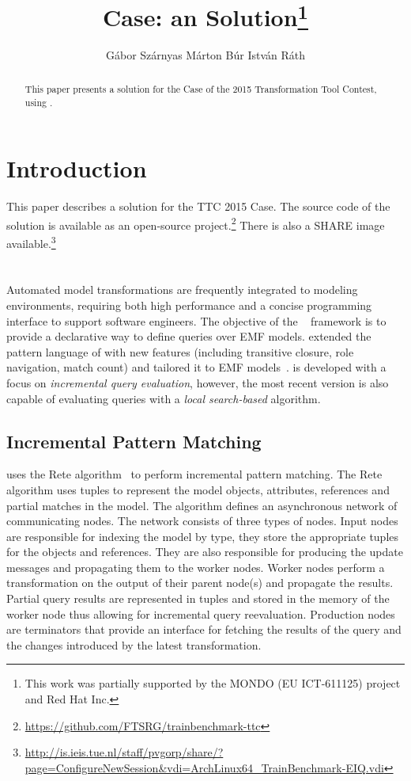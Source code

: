 \documentclass[submission,copyright,creativecommons]{eptcs}
\title{\tb Case: an \eiq Solution\thanks{This work was partially supported by the MONDO (EU ICT-611125) project and Red Hat Inc.}}
\author{G\'{a}bor Sz\'{a}rnyas \qquad M\'{a}rton B\'{u}r \qquad Istv\'{a}n R\'{a}th
\institute{Budapest University of Technology and Economics\\
Department of Measurement and Information Systems\\
H-1117 Magyar tud\'{o}sok krt. 2, Budapest, Hungary}
\email{szarnyas@mit.bme.hu, marton.bur@inf.mit.bme.hu, rath@mit.bme.hu}
}
\begin{document}
\maketitle

\begin{abstract}
This paper presents a solution for the \tb Case of the 2015 Transformation Tool Contest, using \eiq.
\end{abstract}

\section{Introduction}

This paper describes a solution for the TTC 2015 \tb Case. The source code of the solution is available as an open-source project.\footnote{\url{https://github.com/FTSRG/trainbenchmark-ttc}} There is also a SHARE image available.\footnote{\url{http://is.ieis.tue.nl/staff/pvgorp/share/?page=ConfigureNewSession&vdi=ArchLinux64_TrainBenchmark-EIQ.vdi}}

\section{\eiq}

Automated model transformations are frequently integrated to modeling environments, requiring both high performance and a concise programming interface to support software engineers. The objective of the \eiq~\cite{models2010, eiq-homepage} framework is to provide a declarative way to define queries over EMF models. \eiq extended the pattern language of \viatratwo with new features (including transitive closure, role navigation, match count) and tailored it to EMF models~\cite{iqpl}. \eiq is developed with a focus on \emph{incremental query evaluation}, however, the most recent version is also capable of evaluating queries with a \emph{local search-based} algorithm.

\subsection{Incremental Pattern Matching}

\eiq uses the Rete algorithm~\cite{BergmannPhD} to perform incremental pattern matching. The Rete algorithm uses tuples to represent the model objects, attributes, references and partial matches in the model. The algorithm defines an asynchronous network of communicating nodes. The network consists of three types of nodes. Input nodes are responsible for indexing the model by type, \ie they store the appropriate tuples for the objects and references. They are also responsible for producing the update messages and propagating them to the worker nodes. Worker nodes perform a transformation on the output of their parent node(s) and propagate the results. Partial query results are represented in tuples and stored in the memory of the worker node thus allowing for incremental query reevaluation. Production nodes are terminators that provide an interface for fetching the results of the query and the changes introduced by the latest transformation.
\end{document}

